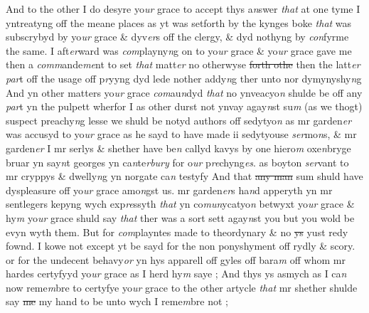 \documentclass[12pt, a4paper]{book}
\begin{document}
            		
		\ifthenelse{\isodd{\thepage}}
		{\reversemarginpar}
		{\normalmarginpar}
		And to the other I do desyre yo\textit{ur} grace to accept thys a\textit{n}swer \textit{that} at one tyme
I yntreatyng off the meane places 
			as yt was setforth by the kynges boke \textit{that} was
subscrybyd by yo\textit{ur} grace \& dyv\textit{er}s off the clergy, \& dyd nothyng by \textit{con}fyrme the
same. I aft\textit{er}ward was \textit{com}playny\textit{n}g on to yo\textit{ur} grace \& yo\textit{ur} grace gave me then
a \textit{comm}ande\textit{me}nt to set \textit{that} matt\textit{er} no otherwyse \sout{forth othe} then the latt\textit{er}
               \textit{par}t off the usage
off p\textit{r}yyng dyd lede nother addy\textit{n}g ther unto nor dymynyshy\textit{n}g And yn other
matters yo\textit{ur} grace \textit{com}au\textit{n}dyd \textit{that} no ynveacyo\textit{n} shulde be off any \textit{par}t yn the pulpett
wherfor I as other durst not ynvay agay\textit{n}st su\textit{m} (as we thogt) suspect preachy\textit{n}g
lesse we shuld be notyd authors off sedytyo\textit{n} as mr garden\textit{er} was accusyd to yo\textit{ur} grace
as he sayd to have made ii sedytyouse \textit{ser}mo\textit{n}s, \& mr garden\textit{er} I mr serlys \& shether
have be\textit{n} callyd kavys by one hiero\textit{m} oxe\textit{n}bryge bruar yn say\textit{n}t georges yn ca\textit{n}te\textit{rbury}
for o\textit{ur} p\textit{re}chyng\textit{es}. as boyton \textit{ser}vant to mr cryppys \& dwelly\textit{n}g yn norgate ca\textit{n} testyfy
And that \sout{any man}
               sum 
			shuld have dyspleasure off yo\textit{ur} grace amo\textit{n}gst us. mr garden\textit{er}s ha\textit{n}d
apperyth yn mr sentlegers kepyng wych exp\textit{re}ssyth \textit{that} yn co\textit{mun}ycatyo\textit{n} betwyxt yo\textit{ur} grace
\& hy\textit{m} yo\textit{ur} grace shuld say \textit{that} ther was a sort sett agay\textit{n}st you but you wold
be evyn wyth them. But for \textit{com}playntes made to theordynary \& no \sout{ys} yust redy
fownd. I kowe not except yt be sayd for the non ponyshyment off rydly
\& scory. or for the undecent behavy\textit{or} yn hys apparell off gyles off bara\textit{m
}off whom mr hardes certyfyyd yo\textit{ur} grace as I herd hy\textit{m} saye ; And thys ys
asmych as I ca\textit{n} now reme\textit{m}bre to certyfye yo\textit{ur} grace to the other artycle \textit{that} mr 
shether shulde say \sout{me }my hand to be unto wych I reme\textit{m}bre not ;
\end{document}
